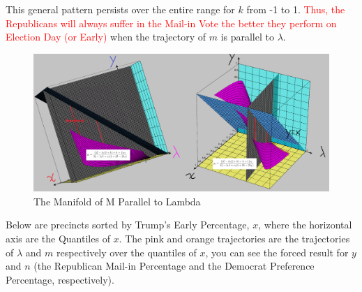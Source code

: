 \documentclass[preprint,13pt]{elsarticle}
\begin{document}
This general pattern persists over the entire range for $k$ from -1 to 1. \textcolor{red}{Thus, the Republicans will always suffer in the Mail-in Vote the better they perform on Election Day (or Early)} when the trajectory of $m$ is parallel to $\lambda$.
\begin{figure}[bp!]
\begin{center}
\caption{The Manifold of M Parallel to Lambda}
\includegraphics[width=400pt]{Parallel Lambda M parametric.png}
\end{center}
\end{figure}
\newpage
Below are precincts sorted by Trump's Early Percentage, $x$, where the horizontal axis are the Quantiles of $x$. The pink and orange trajectories are the trajectories of $\lambda$ and $m$ respectively over the quantiles of $x$, you can see the forced result for $y$ and $n$ (the Republican Mail-in Percentage and the Democrat Preference Percentage, respectively).
\end{document}
